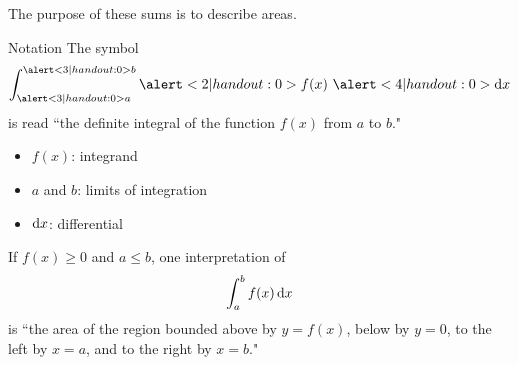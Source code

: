 \begin{frame}
The purpose of these sums is to describe areas.
\end{frame}
\begin{frame}[t]
\begin{block}{Notation}
The symbol
\[\int_{\alert<3|handout:0>{a}}^{\alert<3|handout:0>{b}} \alert<2|handout:0>{f(x)}\ \alert<4|handout:0>{\dee x}\] is read ``the definite integral of the function $f(x)$ from $a$ to $b$."
\end{block}\pause
\begin{itemize}[<+-|alert@+>]
\item $f(x)$: integrand
\item $a$ and $b$: limits of integration
\item $\text{d} x$: differential
\end{itemize}
\end{frame}

\begin{frame}[t]
If $f(x) \geq 0$ and $a \leq b$, one interpretation of 
\[\int_a^b f(x)\, \text{d} x\]
is ``\textcolor{W1}{the area of the region bounded above by $y=f(x)$, below by $y=0$, to the left by $x=a$, and to the right by $x=b$}."
\begin{center}
\end{center}
\end{frame}

